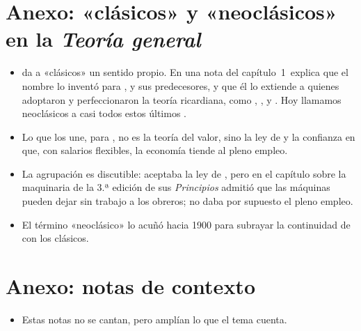 \documentclass[11pt]{article}
\begin{document}
\section{Anexo: «clásicos» y «neoclásicos» en la \emph{Teoría general}}\label{anexo:clasicos}

\begin{itemize}
\item {} da a «clásicos» un sentido propio. En una nota del capítulo~1~explica que el nombre lo inventó  para ,  y sus predecesores, y que él lo extiende a quienes adoptaron y perfeccionaron la teoría ricardiana, como , ,  y \nocite{Keynes1936}. Hoy llamamos neoclásicos a casi todos estos últimos  .
\item Lo que los une, para , no es la teoría del valor, sino la ley de  y la confianza en que, con salarios flexibles, la economía tiende al pleno empleo.
\item La agrupación es discutible:  aceptaba la ley de , pero en el capítulo sobre la maquinaria de la 3.ª edición de sus \emph{Principios} admitió que las máquinas pueden dejar sin trabajo a los obreros; no daba por supuesto el pleno empleo\nocite{Astarita2009Keynes}.
\item El término «neoclásico» lo acuñó  hacia 1900 para subrayar la continuidad de  con los clásicos\nocite{Aspromourgos1986Neoclassical}.
\end{itemize}

\section{Anexo: notas de contexto}\label{anexo:notas}

\begin{itemize}
\item Estas notas no se cantan, pero amplían lo que el tema cuenta.
\end{itemize}
\end{document}

